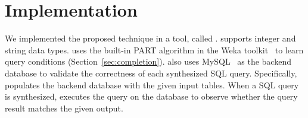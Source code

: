 
\section{Implementation}
\label{sec:implementation}
\vspace{-1mm}

We implemented the proposed technique in a tool, called \ourtool. 
\ourtool supports integer and string data types.
\ourtool uses the built-in PART algorithm in
the Weka toolkit~\cite{Hall:2009} to learn query conditions
(Section~\ref{sec:completion}). \ourtool also uses
MySQL~\cite{mysql} as the backend
database to validate the correctness of each synthesized 
SQL query. Specifically, \ourtool populates the backend database
with the given input tables. When a SQL query is
synthesized, \ourtool executes the query on the database
to observe whether the query result matches the given output.
